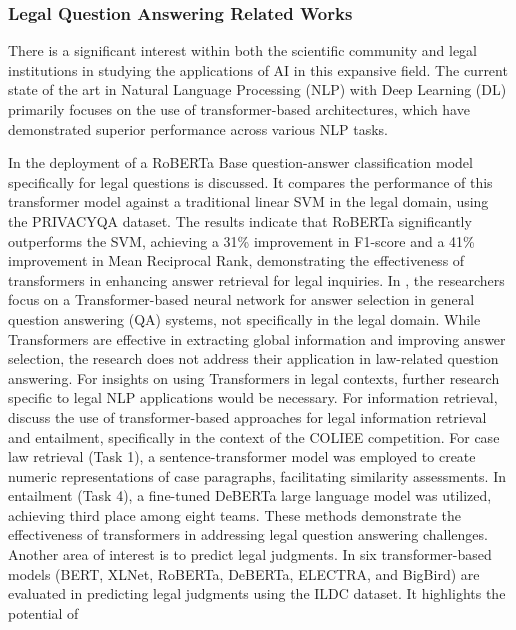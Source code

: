 \documentclass[onecolumn, journal, english, 12pt, a4paper]{IEEEtran} %
\theoremstyle{definition}
\begin{document}
\subsubsection{Legal Question Answering Related Works}
\label{sec:legal-quest-answ-literature}

There is a significant interest within both the scientific community
and legal institutions in studying the applications of AI in this
expansive field. The current state of the art in Natural Language
Processing (NLP) with Deep Learning (DL) primarily focuses on the use
of transformer-based architectures, which have demonstrated superior
performance across various NLP tasks.

In \cite{Vold_Conrad_2021} the deployment of a RoBERTa Base
question-answer classification model specifically for legal questions
is discussed.  It compares the performance of this transformer model
against a traditional linear SVM in the legal domain, using the
PRIVACYQA dataset. The results indicate that RoBERTa significantly
outperforms the SVM, achieving a 31\% improvement in F1-score and a 41\%
improvement in Mean Reciprocal Rank, demonstrating the effectiveness
of transformers in enhancing answer retrieval for legal inquiries. In
\cite{Shao_Guo_Chen_Zepeng_2019}, the researchers focus on a
Transformer-based neural network for answer selection in general
question answering (QA) systems, not specifically in the legal
domain. While Transformers are effective in extracting global
information and improving answer selection, the research does not
address their application in law-related question answering. For
insights on using Transformers in legal contexts, further research
specific to legal NLP applications would be necessary. For information
retrieval, \cite{Kim_Rabelo_Babiker_Rahman_Goebel_2024} discuss the
use of transformer-based approaches for legal information retrieval
and entailment, specifically in the context of the COLIEE
competition. For case law retrieval (Task 1), a sentence-transformer
model was employed to create numeric representations of case
paragraphs, facilitating similarity assessments. In entailment (Task
4), a fine-tuned DeBERTa large language model was utilized, achieving
third place among eight teams. These methods demonstrate the
effectiveness of transformers in addressing legal question answering
challenges. Another area of interest is to predict legal judgments. In
\cite{Gosh_Kumar_2024} six transformer-based models (BERT, XLNet,
RoBERTa, DeBERTa, ELECTRA, and BigBird) are evaluated in predicting
legal judgments using the ILDC dataset. It highlights the potential of
\end{document}
